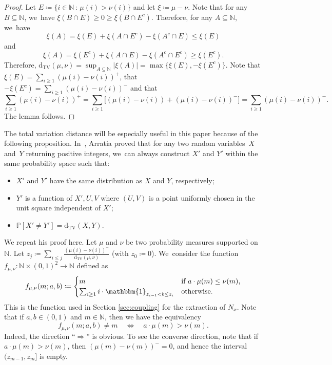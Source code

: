 \documentclass[10pt,a4paper]{amsart}
\newcommand{\NN}{\mathbb{N}}
\newcommand{\PP}{\mathbb{P}}
\newcommand{\one}{\mathbbm{1}}
\newcommand{\dtv}{\mathrm{d}_{\mathrm{TV}}}
\newcommand{\bg}{\big}
\theoremstyle{plain}
\theoremstyle{definition}
\begin{document}
\begin{proof}
Let $E \coloneqq \{i \in \NN \, : \, \mu(i) > \nu(i)\}$ and let $\xi\coloneqq \mu - \nu$. Note that for any $B\subseteq \NN$, we~have $\xi(B\cap E) \ge 0 \ge \xi(B\cap E^c)$. Therefore, for any $A \subseteq \NN$, we~have
\[
\xi(A) = \xi(E) + \xi(A \cap E^c) - \xi(A^c \cap E) \le \xi(E)
\]
and
\[
\xi(A) = \xi(E^c) + \xi(A \cap E) - \xi(A^c \cap E^c) \ge \xi(E^c).
\]
Therefore, $\dtv(\mu, \nu) = \sup_{A \subseteq \NN} |\xi(A)| = \max\{\xi(E), -\xi(E^c)\}$. Note that $\xi(E) = \sum_{i \ge 1} (\mu(i) - \nu(i))^+$, that $-\xi(E^c) = \sum_{i \ge 1} (\mu(i) - \nu(i))^-$ and that
\[
\sum_{i \ge 1} (\mu(i) - \nu(i))^+ = \sum_{i \ge 1} \bg[(\mu(i) - \nu(i)) + (\mu(i) - \nu(i))^-\bg] = \sum_{i \ge 1} (\mu(i) - \nu(i))^-.
\]
The lemma follows.
\end{proof}

The total variation distance will be especially useful in this paper because of the following proposition. In~\cite[\S 3.8]{Arratia02}, Arratia proved that for any two random variables~$X$ and~$Y$ returning positive integers, we~can always construct $X'$ and $Y'$ within the same probability space such that:
\begin{itemize}
\item $X'$ and $Y'$ have the same distribution as $X$ and $Y$, respectively;

\item $Y'$ is a function of $X', U, V$ where $(U, V)$ is a point uniformly chosen in the unit square independent of $X'$;

\item $\PP[X' \ne Y'] = \dtv(X, Y)$.
\end{itemize}
We repeat his proof here. Let $\mu$ and $\nu$ be two probability measures supported on $\NN$. Let $z_j \coloneqq \sum_{i \le j} \frac{(\mu(i) - \nu(i))^-}{\dtv(\mu, \nu)}$ (with $z_0 \coloneqq 0$). We~consider the function $f_{\mu, \nu}\colon \NN \times (0, 1)^2 \to \NN$ defined as
\[
f_{\mu, \nu}(m; a, b) \coloneqq \begin{cases}
m &\text{if $a \cdot \mu(m) \le \nu(m)$,} \\
\sum_{i \ge 1} i \cdot \one_{z_{i-1} < b \le z_i} &\text{otherwise.}
\end{cases}
\]
This is the function used in Section \ref{sec:coupling} for the extraction of $N_x$.
Note that if $a,b\in(0,1)$ and $m\in\NN$, then we have the equivalency
\begin{equation}
\label{eq:f TV property}
f_{\mu, \nu}(m; a, b) \ne m\quad\iff\quad a\cdot \mu(m) > \nu(m).
\end{equation}
Indeed, the direction ``$\Rightarrow$'' is obvious. To see the converse direction, note that if \hbox{$a\cdot\mu(m)>\nu(m)$}, then $(\mu(m)-\nu(m))^-=0$, and hence the interval $(z_{m-1},z_m]$ is empty.
\end{document}
